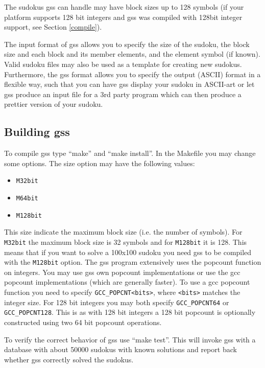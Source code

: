 \documentclass[12pt]{article}
\begin{document}
The sudokus gss can handle may have block sizes up to 128 symbols (if your platform supports 128 bit integers and gss was compiled with 128bit integer support, see Section \ref{compile}).

The input format of gss allows you to specify the size of the sudoku, the block size and each block and its member elements, and the element symbol (if known). Valid sudoku files may also be used as a template for creating new sudokus. Furthermore, the gss format allows you to specify the output (ASCII) format in a flexible way, such that you can have gss display your sudoku in ASCII-art or let gss produce an input file for a 3rd party program which can then produce a prettier version of your sudoku.

\subsection{\label{compile}Building gss}
To compile gss type ``make'' and ``make install''. In the Makefile you may change some options. The size option may have the following values:
\begin{itemize}
	\item{} \verb-M32bit-
	\item{} \verb-M64bit-
	\item{} \verb-M128bit-
\end{itemize}
This size indicate the maximum block size (i.e. the number of symbols). For \verb-M32bit- the maximum block size is 32 symbols and for \verb-M128bit- it is 128. This means that if you want to solve a 100x100 sudoku you need gss to be compiled with the \verb-M128bit- option. The gss program extensively uses the popcount function on integers. You may use gss own popcount implementations or use the gcc popcount implementations (which are generally faster). To use a gcc popcount function you need to specify \verb-GCC_POPCNT<bits>-, where \verb-<bits>- matches the integer size. For 128 bit integers you may both specify \verb-GCC_POPCNT64- or \verb-GCC_POPCNT128-. This is as with 128 bit integers a 128 bit popcount is optionally constructed using two 64 bit popcount operations.

To verify the correct behavior of gss use ``make test''. This will invoke gss with a database with about 50000 sudokus with known solutions and report back whether gss correctly solved the sudokus. 
\end{document}
